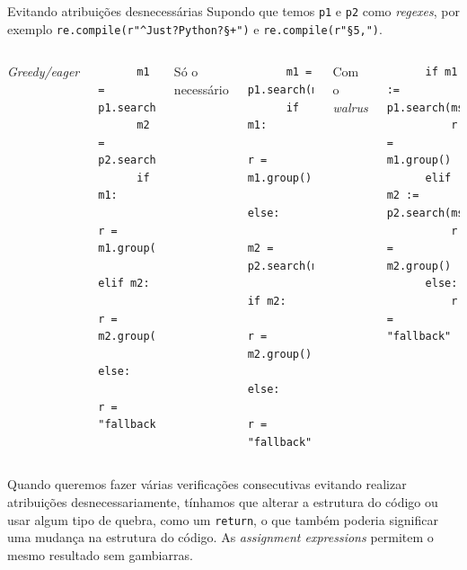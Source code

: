 \documentclass[utf8]{beamer}
\begin{document}
\begin{frame}[fragile]{Evitando atribuições desnecessárias}
  Supondo que temos \texttt{p1} e \texttt{p2}
  como \emph{regexes}, por exemplo
  \texttt{re.compile(r"^Just\s?Python\s?\S+")}
  e \texttt{re.compile(r"\S{5,}")}.
  \vspace{.5em}
  \vfill
  \begin{columns}[t]
    \emph{Greedy/eager}
    \vspace{-1em}
    \begin{verbatim}
      m1 = p1.search(msg)
      m2 = p2.search(msg)
      if m1:
          r = m1.group()
      elif m2:
          r = m2.group()
      else:
          r = "fallback"
    \end{verbatim}

    Só o necessário
    \vspace{-1em}
    \begin{verbatim}
      m1 = p1.search(msg)
      if m1:
          r = m1.group()
      else:
          m2 = p2.search(msg)
          if m2:
              r = m2.group()
          else:
              r = "fallback"
    \end{verbatim}

    Com o \emph{walrus}
    \vspace{-1em}
    \begin{verbatim}
      if m1 := p1.search(msg):
          r = m1.group()
      elif m2 := p2.search(msg):
          r = m2.group()
      else:
          r = "fallback"
    \end{verbatim}
  \end{columns}
  \vfill
  Quando queremos fazer várias verificações consecutivas
  evitando realizar atribuições desnecessariamente,
  tínhamos que alterar a estrutura do código
  ou usar algum tipo de quebra, como um \texttt{return},
  o que também poderia significar uma mudança na estrutura do código.
  As \emph{assignment expressions} permitem o mesmo resultado
  sem gambiarras.
\end{frame}
\end{document}
